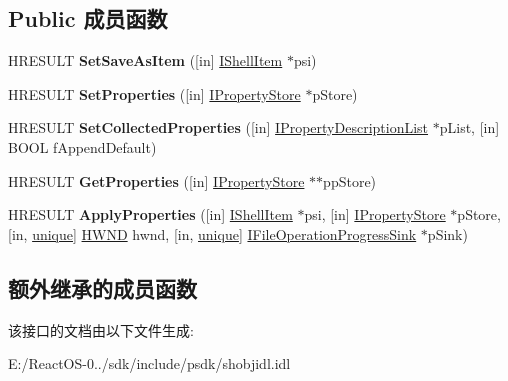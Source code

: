 \subsection*{Public 成员函数}
\begin{DoxyCompactItemize}
\item 
\mbox{\label{interface_i_file_save_dialog_a38f580b60bb6fc8ec0943ae6273fa81c}} 
H\+R\+E\+S\+U\+LT {\bfseries Set\+Save\+As\+Item} (\mbox{[}in\mbox{]} \hyperlink{interface_i_shell_item}{I\+Shell\+Item} $\ast$psi)
\item 
\mbox{\label{interface_i_file_save_dialog_a4718f364e24ed66bb433ce155e9023f8}} 
H\+R\+E\+S\+U\+LT {\bfseries Set\+Properties} (\mbox{[}in\mbox{]} \hyperlink{interface_i_property_store}{I\+Property\+Store} $\ast$p\+Store)
\item 
\mbox{\label{interface_i_file_save_dialog_a39220b6f05838a443f3aba480c48ee9a}} 
H\+R\+E\+S\+U\+LT {\bfseries Set\+Collected\+Properties} (\mbox{[}in\mbox{]} \hyperlink{interface_i_property_description_list}{I\+Property\+Description\+List} $\ast$p\+List, \mbox{[}in\mbox{]} B\+O\+OL f\+Append\+Default)
\item 
\mbox{\label{interface_i_file_save_dialog_a7cc85d25e590a1ce929dc4d5139e9301}} 
H\+R\+E\+S\+U\+LT {\bfseries Get\+Properties} (\mbox{[}in\mbox{]} \hyperlink{interface_i_property_store}{I\+Property\+Store} $\ast$$\ast$pp\+Store)
\item 
\mbox{\label{interface_i_file_save_dialog_afa8f37edf3a758d05547f2a5845f8b21}} 
H\+R\+E\+S\+U\+LT {\bfseries Apply\+Properties} (\mbox{[}in\mbox{]} \hyperlink{interface_i_shell_item}{I\+Shell\+Item} $\ast$psi, \mbox{[}in\mbox{]} \hyperlink{interface_i_property_store}{I\+Property\+Store} $\ast$p\+Store, \mbox{[}in, \hyperlink{interfaceunique}{unique}\mbox{]} \hyperlink{interfacevoid}{H\+W\+ND} hwnd, \mbox{[}in, \hyperlink{interfaceunique}{unique}\mbox{]} \hyperlink{interface_i_file_operation_progress_sink}{I\+File\+Operation\+Progress\+Sink} $\ast$p\+Sink)
\end{DoxyCompactItemize}
\subsection*{额外继承的成员函数}


该接口的文档由以下文件生成\+:\begin{DoxyCompactItemize}
\item 
E\+:/\+React\+O\+S-\/0../sdk/include/psdk/shobjidl.\+idl\end{DoxyCompactItemize}
